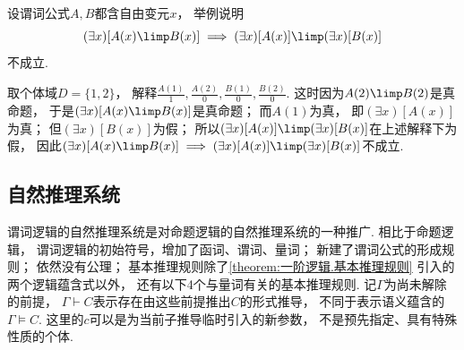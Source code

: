 \begin{example}
设谓词公式\(A,B\)都含自由变元\(x\)，
举例说明\begin{equation*}
	(\exists x)[A(x) \limp B(x)] \implies (\exists x)[A(x)] \limp (\exists x)[B(x)]
\end{equation*}不成立.
    \begin{solution}
取个体域\(D = \{1,2\}\)，
解释\(
	\frac{A(1)}1,
	\frac{A(2)}0,
	\frac{B(1)}0,
	\frac{B(2)}0
\).
这时因为\(A(2) \limp B(2)\)是真命题，
于是\((\exists x)[A(x) \limp B(x)]\)是真命题；
而\(A(1)\)为真，
即\((\exists x)[A(x)]\)为真；
但\((\exists x)[B(x)]\)为假；
所以\((\exists x)[A(x)] \limp (\exists x)[B(x)]\)在上述解释下为假，
因此\((\exists x)[A(x) \limp B(x)] \implies (\exists x)[A(x)] \limp (\exists x)[B(x)]\)不成立.
    \end{solution}
\end{example}

\subsection{自然推理系统}
谓词逻辑的自然推理系统是对命题逻辑的自然推理系统的一种推广.
相比于命题逻辑，
谓词逻辑的初始符号，增加了函词、谓词、量词；
新建了谓词公式的形成规则；
依然没有公理；
基本推理规则除了\cref{theorem:一阶逻辑.基本推理规则} 引入的两个逻辑蕴含式以外，
还有以下4个与量词有关的基本推理规则.
记\(\Gamma\)为尚未解除的前提，
\(\Gamma\vdash C\)表示存在由这些前提推出\(C\)的形式推导，
不同于表示语义蕴含的\(\Gamma\models C\).
这里的\(c\)可以是为当前子推导临时引入的新参数，
不是预先指定、具有特殊性质的个体.

